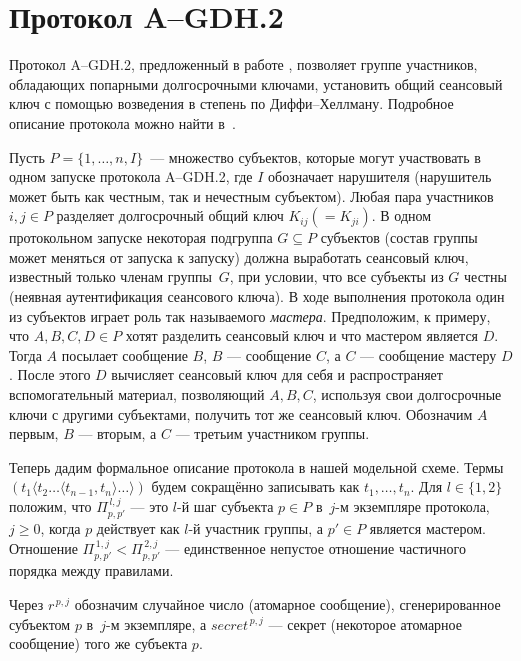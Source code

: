 \section{Протокол A--GDH.2}

Протокол A--GDH.2, предложенный в работе \cite{SteinerTsudikWaidner1998},
позволяет группе участников, обладающих попарными долгосрочными ключами,
установить общий сеансовый ключ с помощью возведения в степень
по Диффи–Хеллману.
Подробное описание протокола можно найти
в~\cite{SteinerTsudikWaidner1998}.

Пусть \(P=\{1,\dots,n,I\}\)~— множество субъектов,
которые могут участвовать в одном запуске протокола A--GDH.2,
где \(I\) обозначает нарушителя
(нарушитель может быть как честным, так и нечестным субъектом).
Любая пара участников \(i,j\in P\) разделяет долгосрочный общий ключ
\(K_{ij}(=K_{ji})\).
В одном протокольном запуске
некоторая подгруппа \(G\subseteq P\) субъектов
(состав группы может меняться от запуска к запуску)
должна выработать сеансовый ключ, известный только членам группы~\(G\),
при условии, что все субъекты из \(G\) честны
(неявная аутентификация сеансового ключа).
В ходе выполнения протокола один из субъектов играет роль так называемого
\emph{мастера}.
Предположим, к примеру, что \(A,B,C,D\in P\) хотят разделить сеансовый ключ
и что мастером является \(D\).
Тогда \(A\) посылает сообщение \(B\), \(B\) — сообщение \(C\),
а \(C\) — сообщение мастеру \(D\).
После этого \(D\) вычисляет сеансовый ключ для себя и
распространяет вспомогательный материал,
позволяющий \(A,B,C\), используя свои долгосрочные ключи
с другими субъектами, получить тот же сеансовый ключ.
Обозначим \(A\) первым, \(B\) — вторым, а \(C\) — третьим участником группы.

Теперь дадим формальное описание протокола в нашей модельной схеме.
Термы \((t_{1}\langle t_{2}\dots\langle t_{n-1},t_{n}\rangle\dots\rangle)\)
будем сокращённо записывать как \(t_{1},\dots,t_{n}\).
Для \(l\in\{1,2\}\) положим, что
\(\Pi^{\,l,j}_{p,p'}\) — это \(l\)-й шаг субъекта \(p\in P\)
в~\(j\)-м экземпляре протокола, \(j\ge 0\),
когда \(p\) действует как \(l\)-й участник группы,
а \(p'\in P\) является мастером.
Отношение
\(
   \Pi^{\,1,j}_{p,p'} < \Pi^{\,2,j}_{p,p'}
\)
— единственное непустое отношение частичного порядка между правилами.

Через \(\mathit{r}^{\,p,j}\) обозначим случайное число  
(атомарное сообщение), сгенерированное субъектом \(p\)
в~\(j\)-м экземпляре, а  
\(\mathit{secret}^{\,p,j}\) — секрет  
(некоторое атомарное сообщение) того же субъекта \(p\).

